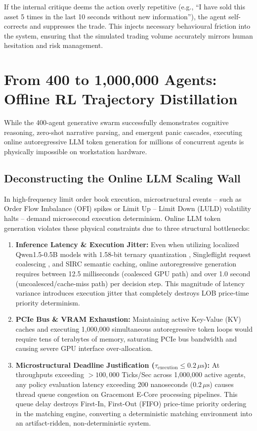 If the internal critique deems the action overly repetitive (e.g., ``I have sold this asset 5 times in the last 10 seconds without new information''), the agent self-corrects and suppresses the trade. This injects necessary behavioural friction into the system, ensuring that the simulated trading volume accurately mirrors human hesitation and risk management.

\section{From 400 to 1,000,000 Agents: Offline RL Trajectory Distillation}
\label{sec:offline_distillation_intro}

While the 400-agent generative swarm successfully demonstrates cognitive reasoning, zero-shot narrative parsing, and emergent panic cascades, executing online autoregressive LLM token generation for millions of concurrent agents is physically impossible on workstation hardware. 

\subsection{Deconstructing the Online LLM Scaling Wall}

In high-frequency limit order book execution, microstructural events -- such as Order Flow Imbalance (OFI) spikes or Limit Up -- Limit Down (LULD) volatility halts -- demand microsecond execution determinism. Online LLM token generation violates these physical constraints due to three structural bottlenecks:
\begin{enumerate}
    \item \textbf{Inference Latency \& Execution Jitter:} Even when utilizing localized Qwen1.5-0.5B models with 1.58-bit ternary quantization \cite{ma2024bitnet}, Singleflight request coalescing \cite{fitzpatrick2018singleflight, vattani2015cache}, and SIRC semantic caching, online autoregressive generation requires between 12.5 milliseconds (coalesced GPU path) and over 1.0 second (uncoalesced/cache-miss path) per decision step. This magnitude of latency variance introduces execution jitter that completely destroys LOB price-time priority determinism.
    \item \textbf{PCIe Bus \& VRAM Exhaustion:} Maintaining active Key-Value (KV) caches and executing 1,000,000 simultaneous autoregressive token loops would require tens of terabytes of memory, saturating PCIe bus bandwidth and causing severe GPU interface over-allocation.
    \item \textbf{Microstructural Deadline Justification ($\tau_{\text{execution}} \le 0.2\,\mu\text{s}$):} At throughputs exceeding $> 100,000$ Ticks/Sec across 1,000,000 active agents, any policy evaluation latency exceeding 200 nanoseconds ($0.2\,\mu\text{s}$) causes thread queue congestion on Gracemont E-Core processing pipelines. This queue delay destroys First-In, First-Out (FIFO) price-time priority ordering in the matching engine, converting a deterministic matching environment into an artifact-ridden, non-deterministic system.
\end{enumerate}

